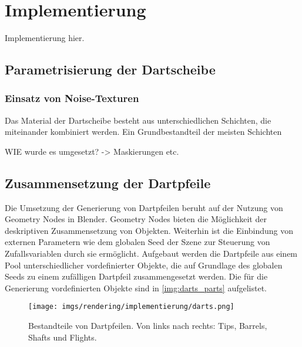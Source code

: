 
\section{Implementierung}
\label{sec:daten:implementierung}

Implementierung hier.



\subsection{Parametrisierung der Dartscheibe}  %
\label{sec:dartscheibe_parametrisierung}

\subsubsection{Einsatz von Noise-Texturen}

Das Material der Dartscheibe besteht aus unterschiedlichen Schichten, die miteinander kombiniert werden. Ein Grundbestandteil der meisten Schichten

WIE wurde es umgesetzt? -> Maskierungen etc.

\todo{}

\subsection{Zusammensetzung der Dartpfeile}  %
\label{sec:dartpfeile_zusammensetzung}

Die Umsetzung der Generierung von Dartpfeilen beruht auf der Nutzung von Geometry Nodes in Blender. Geometry Nodes bieten die Möglichkeit der deskriptiven Zusammensetzung von Objekten. Weiterhin ist die Einbindung von externen Parametern wie dem globalen Seed der Szene zur Steuerung von Zufallsvariablen durch sie ermöglicht. Aufgebaut werden die Dartpfeile aus einem Pool unterschiedlicher vordefinierter Objekte, die auf Grundlage des globalen Seeds zu einem zufälligen Dartpfeil zusammengesetzt werden. Die für die Generierung vordefinierten Objekte sind in \autoref{img:darts_parts} aufgelistet.

\begin{figure}
    \centering
    \texttt{[image: imgs/rendering/implementierung/darts.png]}
    \caption{Bestandteile von Dartpfeilen. Von links nach rechts: Tips, Barrels, Shafts und Flights.}
    \label{img:darts_parts}
\end{figure}

